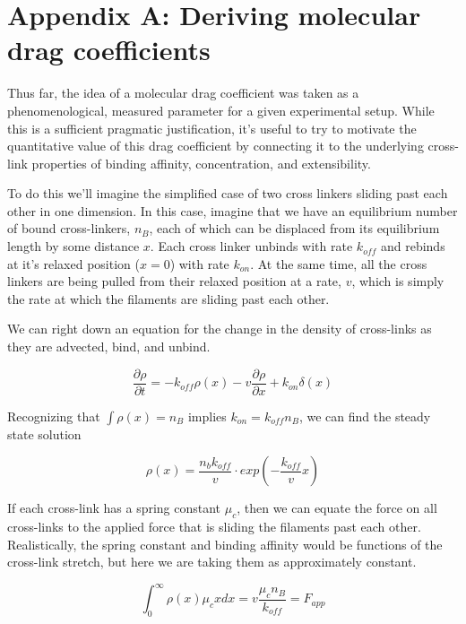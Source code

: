 \documentclass[prb,11pt]{revtex4-1}
\begin{document}
\section{Appendix A: Deriving molecular drag coefficients}
Thus far, the idea of a molecular drag coefficient was taken as a phenomenological, measured parameter for a given experimental setup.  While this is a sufficient pragmatic justification, it's useful to try to motivate the quantitative value of this drag coefficient by connecting it to the underlying cross-link properties of binding affinity, concentration, and extensibility.

To do this we'll imagine the simplified case of two cross linkers sliding past each other in one dimension.  In this case, imagine that we have an equilibrium number of bound cross-linkers, $n_B$, each of which can be displaced from its equilibrium length by some distance $x$.  Each cross linker unbinds with rate $k_{off}$ and rebinds at it's relaxed position ($x=0$) with rate $k_{on}$.  At the same time, all the cross linkers are being pulled from their relaxed position at a rate, $v$, which is simply the rate at which the filaments are sliding past each other.  

We can right down an equation for the change in the density of cross-links as they are advected, bind, and unbind.

\begin{equation}
\frac{\partial \rho}{\partial t} = -k_{off}\rho(x) - v\frac{\partial \rho}{\partial x} + k_{on}\delta(x)
\end{equation}

Recognizing that $\int \rho(x)=n_B$ implies $k_{on}=k_{off}n_B$, we can find the steady state solution

\begin{equation}
\rho(x) = \frac{n_b k_{off}}{v}\cdot exp\left ( -\frac{k_{off}}{v}x \right )
\end{equation}

If each cross-link has a spring constant $\mu_c$, then we can equate the force on all cross-links to the applied force that is sliding the filaments past each other.  Realistically, the spring constant and binding affinity would be functions of the cross-link stretch, but here we are taking them as approximately constant.

\begin{equation}
\int_{0}^{\infty}\rho(x)\mu_cx dx = v \frac{\mu_c n_B}{k_{off}}= F_{app}
\end{equation}
\end{document}

